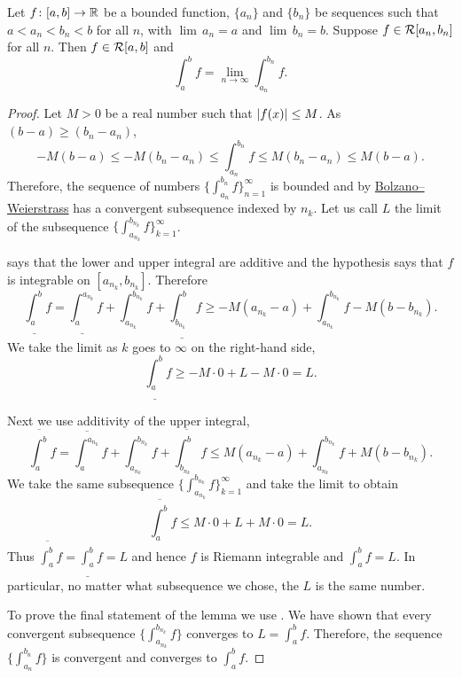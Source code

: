 \begin{lemma} \label{lemma:boundedimpriemann}
Let $f \colon [a,b] \to {\mathbb{R}}$ be a bounded function,
$\{ a_n \}$ and $\{b_n \}$ be sequences such that
$a < a_n < b_n < b$ for all $n$, with
$\lim \, a_n = a$ and $\lim \, b_n = b$.
Suppose $f \in {\mathcal{R}}[a_n,b_n]$ for all $n$.
Then $f \in {\mathcal{R}}[a,b]$ and
\begin{equation*}
\int_a^b f = 
\lim_{n \to \infty} \int_{a_n}^{b_n} f .
\end{equation*}
\end{lemma}

\begin{proof}
Let $M > 0$ be a real number such that $\left\lvert {f(x)} \right\rvert \leq M$.
As $(b-a) \geq (b_n-a_n)$,
\begin{equation*}
-M(b-a) \leq
-M(b_n-a_n) \leq
\int_{a_n}^{b_n} f
\leq
M(b_n-a_n) \leq
M(b-a) .
\end{equation*}
Therefore, the sequence of numbers
$\bigl\{ \int_{a_n}^{b_n} f \bigr\}_{n=1}^\infty$ is bounded and by
\hyperref[thm:bwseq]{Bolzano--Weierstrass}
has a convergent subsequence indexed by $n_k$.  Let us call
$L$ the limit of the subsequence
$\bigl\{ \int_{a_{n_k}}^{b_{n_k}} f \bigr\}_{k=1}^\infty$.

 says that
the lower and upper integral are additive
and the hypothesis says that
$f$ is integrable on $[a_{n_k},b_{n_k}]$.
Therefore
\begin{equation*}
\underline{\int_a^b} f
=
\underline{\int_a^{a_{n_k}}} f
+
\int_{a_{n_k}}^{b_{n_k}} f
+
\underline{\int_{b_{n_k}}^b} f
\geq
-M(a_{n_k}-a)
+
\int_{a_{n_k}}^{b_{n_k}} f
-
M(b-b_{n_k}) .
\end{equation*}
We take the limit as $k$ goes to $\infty$ on the right-hand side,
\begin{equation*}
\underline{\int_a^b} f
\geq
-M\cdot 0
+
L
-
M\cdot 0
= L .
\end{equation*}

Next we use additivity of the upper integral,
\begin{equation*}
\overline{\int_a^b} f
=
\overline{\int_a^{a_{n_k}}} f
+
\int_{a_{n_k}}^{b_{n_k}} f
+
\overline{\int_{b_{n_k}}^b} f
\leq
M(a_{n_k}-a)
+
\int_{a_{n_k}}^{b_{n_k}} f
+
M(b-b_{n_k}) .
\end{equation*}
We take the same subsequence 
$\{ \int_{a_{n_k}}^{b_{n_k}} f \}_{k=1}^\infty$ and take the limit 
to obtain
\begin{equation*}
\overline{\int_a^b} f
\leq
M\cdot 0
+
L
+
M\cdot 0
= L .
\end{equation*}
Thus $\overline{\int_a^b} f = \underline{\int_a^b} f = L$
and hence $f$ is Riemann integrable and $\int_a^b f = L$.
In particular, no matter what
subsequence we chose,
the $L$ is the same number.

To prove the final statement of the lemma we use 
.  We have shown that every convergent
subsequence
$\bigl\{ \int_{a_{n_k}}^{b_{n_k}} f \bigr\}$ converges to $L = \int_a^b f$.
Therefore, the sequence
$\bigl\{ \int_{a_n}^{b_n} f \bigr\}$ is convergent and converges to $\int_a^b f$.
\end{proof}


